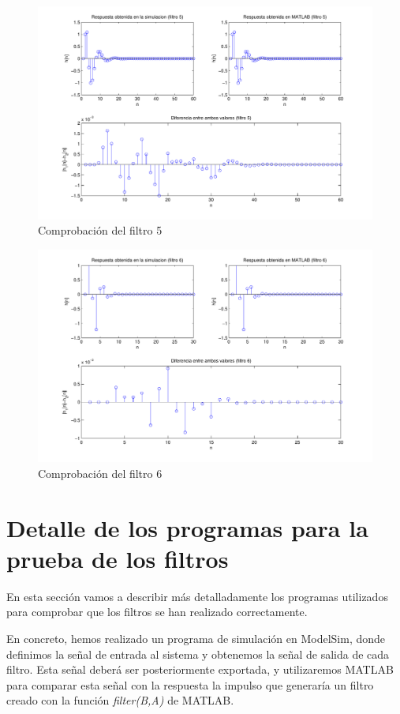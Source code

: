 \documentclass[a4paper,12pt]{report}
\begin{document}
\begin{figure}[hbt]
\includegraphics[width=\textwidth]{img/respfiltro5.pdf} 
\caption{Comprobación del filtro 5} \label{fig:filter5}
\end{figure}

\begin{figure}[hbt]
\includegraphics[width=\textwidth]{img/respfiltro6.pdf} 
\caption{Comprobación del filtro 6} \label{fig:filter6}
\end{figure}

\clearpage

\section{Detalle de los programas para la prueba de los filtros}
En esta sección vamos a describir más detalladamente los programas utilizados para comprobar que los filtros se han realizado correctamente.

En concreto, hemos realizado un programa de simulación en ModelSim, donde definimos la señal de entrada al sistema y obtenemos la señal de salida de cada filtro. Esta señal deberá ser posteriormente exportada, y utilizaremos MATLAB para comparar esta señal con la respuesta la impulso que generaría un filtro creado con la función \emph{filter(B,A)} de MATLAB.
\end{document}
